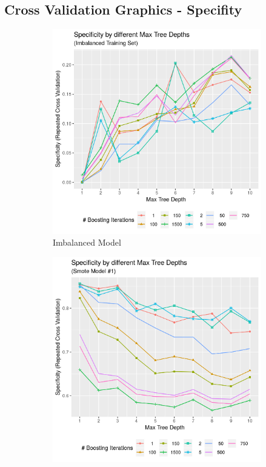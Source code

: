 \documentclass[12pt,a4paper]{article}
\begin{document}
\begin{appendices}
\section{Cross Validation Graphics - Specifity}\label{app:cv_graphics_spec}
\begin{figure}[h!] %
\begin{subfigure}{0.48\textwidth}
\includegraphics[width=\linewidth]{./graphics/cv/Spec_by_treeDepth_complete.png}
\caption{Imbalanced Model} \label{fig:a}
\end{subfigure}\hspace*{\fill}
\begin{subfigure}{0.48\textwidth}
\includegraphics[width=\linewidth]{./graphics/cv/Spec_by_treeDepth_smote1.png}

\end{subfigure}
\end{figure}
\end{appendices}
\end{document}
